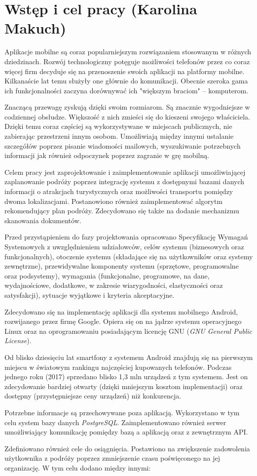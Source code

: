 \documentclass[10pt,twoside,a4paper]{report}
\begin{document}
\chapter{Wstęp i cel pracy (Karolina Makuch)}
\par Aplikacje mobilne są coraz popularniejszym rozwiązaniem stosowanym w różnych dziedzinach. Rozwój technologiczny potęguje możliwości telefonów przez co coraz więcej firm decyduje się na przenoszenie swoich aplikacji na platformy mobilne. Kilkanaście lat temu  służyły one głównie do komunikacji. Obecnie szeroka gama ich funkcjonalności zaczyna dorównywać ich "większym braciom" -- komputerom.
\par Znaczącą przewagę zyskują dzięki swoim rozmiarom. Są znacznie wygodniejsze w codziennej obsłudze. Większość z nich zmieści się do kieszeni swojego właściciela. Dzięki temu coraz częściej są wykorzystywane w miejscach publicznych, nie zabierając przestrzeni innym osobom. Umożliwiają między innymi ustalanie szczegółów poprzez pisanie wiadomości mailowych, wyszukiwanie potrzebnych informacji jak również odpoczynek poprzez zagranie w grę mobilną.
\par Celem pracy jest zaprojektowanie i zaimplementowanie aplikacji umożliwiającej zaplanowanie podróży poprzez integrację systemu z dostępnymi bazami danych informacji o atrakcjach turystycznych oraz możliwości transportu pomiędzy dwoma lokalizacjami. Postanowiono również zaimplementować algorytm rekomendujący plan podróży. Zdecydowano się także na dodanie mechanizmu skanowania dokumentów. 
\par Przed przystąpieniem do fazy projektowania opracowano Specyfikację Wymagań Systemowych z uwzględnieniem udziałowców, celów systemu (biznesowych oraz funkcjonalnych), otoczenie systemu (składające się na użytkowników oraz systemy zewnętrzne), przewidywalne komponenty systemu (sprzętowe, programowalne oraz podsystemy), wymagania (funkcjonalne, programowe, na dane, wydajnościowe, dodatkowe, w zakresie wiarygodności, elastyczności oraz satysfakcji), sytuacje wyjątkowe i kryteria akceptacyjne.
\par Zdecydowano się na implementację aplikacji dla systemu mobilnego Android, rozwijanego przez firmę Google. Opiera się on na jądrze systemu operacyjnego Linux oraz na oprogramowaniu posiadającym licencję GNU (\textit{GNU General Public License}).
 \par Od blisko dziesięciu lat smartfony z systemem Android znajdują się na pierwszym miejscu w światowym rankingu najczęściej kupowanych telefonów. Podczas jednego roku (2017) sprzedano blisko 1,3 mln urządzeń z tym systemem. Jest on zdecydowanie bardziej otwarty (dzięki mniejszym kosztom implementacji) oraz dostępny (przystępniejsze ceny urządzeń) niż konkurencja.
\par Potrzebne informacje są przechowywane poza aplikacją. Wykorzystano w tym celu system bazy danych \textit{PostgreSQL}. Zaimplementowano również serwer umożliwiający komunikację pomiędzy bazą a aplikacją oraz z zewnętrznym API.
\par Zdefiniowano również cele do osiągnięcia. Postawiono na zwiększenie zadowolenia użytkownika z podróży poprzez zmniejszenie czasu poświęconego na jej organizację. W tym celu dodano między innymi:
\end{document}
